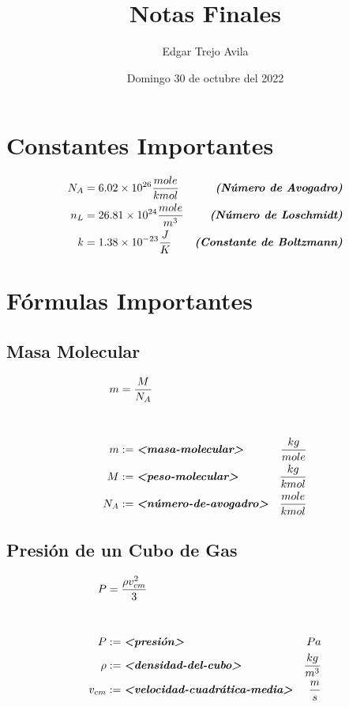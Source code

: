 \documentclass{article}
\title{Notas Finales}
\author{Edgar Trejo Avila}
\date{Domingo 30 de octubre del 2022}
\begin{document}
\maketitle

\section*{Constantes Importantes}

\begin{align*}
    N_A &= 6.02 \times 10^{26} \frac{mole}{kmol} &\textit{\textbf{(Número de Avogadro)}} \\
    n_L &= 26.81 \times 10^{24} \frac{mole}{m^3} &\textit{\textbf{(Número de Loschmidt)}} \\
    k   &= 1.38 \times 10^{-23} \frac{J}{K}      &\textit{\textbf{(Constante de Boltzmann)}} \\
\end{align*}

\section*{Fórmulas Importantes}

\subsection*{Masa Molecular}

\begin{align*}
    m   &= \frac{M}{N_A} \\[1cm]
    m   &:=  \textit{\textbf{<masa-molecular>}}     &\frac{kg}{mole} \\
    M   &:=  \textit{\textbf{<peso-molecular>}}     &\frac{kg}{kmol} \\
    N_A &:= \textit{\textbf{<número-de-avogadro>}}  &\frac{mole}{kmol}
\end{align*}

\subsection*{Presión de un Cubo de Gas}

\begin{align*}
    P           &= \frac{\rho v_{cm}^2}{3} \\[1cm]
    P           &:= \textit{\textbf{<presión>}}                     &Pa \\
    \rho        &:= \textit{\textbf{<densidad-del-cubo>}}           &\frac{kg}{m^3} \\
    v_{cm}      &:= \textit{\textbf{<velocidad-cuadrática-media>}}  &\frac{m}{s}
\end{align*}
\end{document}
